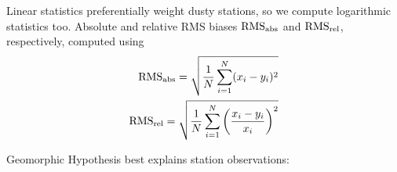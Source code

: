 \documentclass[final,dvips]{foils}
\begin{document}
\rotatefoilhead{\bgl
\Large\textcolor{blue}{\hfill Linear and Logarithmic Statistics \hfill}}\vspace{-0.5in}\large
Linear statistics preferentially weight dusty stations, so we compute
logarithmic statistics too.
Absolute and relative RMS biases $\mathrm{RMS}_{\mathrm{abs}}$ and $\mathrm{RMS}_{\mathrm{rel}}$,
respectively, computed using
\begin{eqnarray}
\mathrm{RMS}_{\mathrm{abs}} = \sqrt{ \frac{1}{N} 
\sum_{i = 1}^{N} 
( x_{i} - y_{i} )^{2} } \\
\mathrm{RMS}_{\mathrm{rel}} = \sqrt{ \frac{1}{N} 
\sum_{i = 1}^{N} 
\left( \frac{x_{i} - y_{i}}{x_{i}} \right)^{2} }
\label{eqn:rms_abs}
\end{eqnarray}

\rotatefoilhead{
\Large\textcolor{blue}{\hfill Statistics \hfill}}\vspace{-0.5in}\large
Geomorphic Hypothesis best explains station observations:
\end{document}
